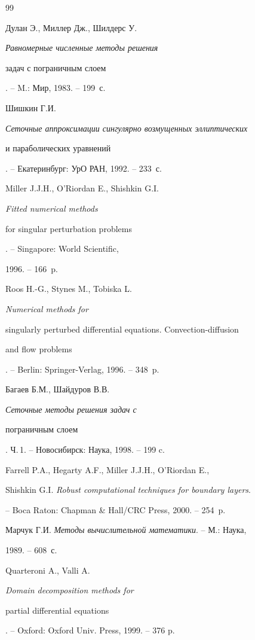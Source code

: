 \begin{thebibliography}{99}







Дулан Э., Миллер Дж., Шилдерс У. {\em Равномерные численные методы решения 


задач с пограничным слоем}. -- M.: Мир, 1983. -- 199~с.




Шишкин Г.И. {\em Сеточные аппроксимации сингулярно возмущенных эллиптических


и параболических уравнений}. -- Екатеринбург: УрО РАН, 1992. -- 233~с.




Miller J.J.H., O'Riordan E., Shishkin G.I. {\em Fitted numerical methods


for singular perturbation problems}. -- Singapore: World Scientific,


1996. -- 166~p.




Roos H.-G., Stynes M., Tobiska L. {\em Numerical methods for


singularly perturbed differential equations. Convection-diffusion


and flow problems}. -- Berlin: Springer-Verlag, 1996. -- 348~p.




Багаев Б.М., Шайдуров В.В. {\em Сеточные методы решения задач с


пограничным слоем}. Ч.\,1. -- Новосибирск: Наука, 1998. -- 199 c.




Farrell P.A., Hegarty A.F., Miller J.J.H., O'Riordan E.,


Shishkin G.I. {\em Robust computational techniques for boundary layers}.


-- Boca Raton: Chapman \& Hall/CRC Press, 2000. -- 254~p.




Марчук Г.И. {\em Методы вычислительной математики}. -- М.: Наука,


1989. -- 608~с.




Quarteroni A., Valli A. {\em Domain decomposition methods for


partial differential equations}. -- Oxford: Oxford Univ. Press, 1999. -- 376 p.





\end{thebibliography}
